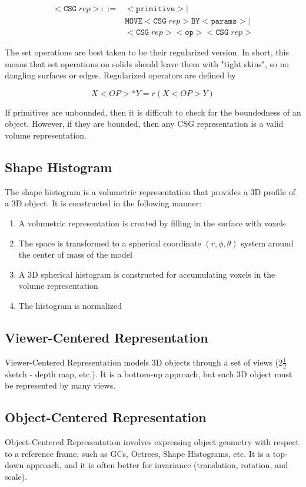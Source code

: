 \documentclass{article}
\begin{document}
\begin{multicols}{3}
\[
\begin{aligned}  
  <\mathtt{CSG}\; rep> ::= & <\mathtt{primitive}> | \\
  &\mathtt{MOVE} <\mathtt{CSG}\; rep> \mathtt{BY} <\mathtt{params}> | \\
  & <\mathtt{CSG}\; rep> <\mathtt{op}> <\mathtt{CSG}\; rep>
\end{aligned}
\]

The set operations are best taken to be their regularized version. In short, this means that set operations on solids should leave them with "tight skins", so no dangling surfaces or edges. Regularized operators are defined by

$$
X <OP> * Y =  r(X <OP> Y)
$$

If primitives are unbounded, then it is difficult to check for the boundedness of an object. However, if they are bounded, then any CSG representation is a valid volume representation.

\subsection{Shape Histogram}

The shape histogram is a volumetric representation that provides a 3D profile of a 3D object. It is constructed in the following manner:

\begin{enumerate}
\itemsep0em
\item A volumetric representation is created by filling in the surface with voxels
\item The space is transformed to a spherical coordinate $(r, \phi, \theta )$ system around the center of mass of the model
\item A 3D spherical histogram is constructed for accumulating voxels in the volume representation
\item The histogram is normalized
\end{enumerate}

\subsection{Viewer-Centered Representation}

Viewer-Centered Representation models 3D objects through a set of views ($2 \frac{1}{2}$ sketch - depth map, etc.). It is a bottom-up approach, but each 3D object must be represented by many views.

\subsection{Object-Centered Representation}

Object-Centered Representation involves expressing object geometry with respect to a reference frame, such as GCs, Octrees, Shape Histograms, etc. It is a top-down approach, and it is often better for invariance (translation, rotation, and scale).

\end{multicols}
\end{document}
